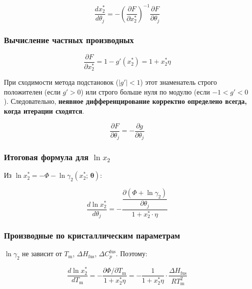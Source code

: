 \documentclass[11pt]{article}
\begin{document}
\begin{equation*}
\frac{dx_2^{*}}{d\theta_j} = -\left(\frac{\partial F}{\partial x_2^{*}}\right)^{-1} \frac{\partial F}{\partial \theta_j}
\end{equation*}

\subsubsection{Вычисление частных производных}

\begin{equation*}
\frac{\partial F}{\partial x_2^{*}} = 1 - g'(x_2^{*}) = 1 + x_2^{*} \eta
\end{equation*}

При сходимости метода подстановок ($|g'| < 1$) этот знаменатель строго положителен (если $g' > 0$) или строго больше нуля по модулю (если $-1 < g' < 0$). Следовательно, \textbf{неявное дифференцирование корректно определено всегда, когда итерации сходятся}.

\begin{equation*}
\frac{\partial F}{\partial \theta_j} = -\frac{\partial g}{\partial \theta_j}
\end{equation*}

\subsubsection{Итоговая формула для $\ln x_2$}

Из $\ln x_2^{*} = -\Phi - \ln \gamma_2(x_2^{*};\, \boldsymbol{\theta})$:

\begin{equation*}
\boxed{\frac{d\ln x_2^{*}}{d\theta_j} = -\frac{\dfrac{\partial (\Phi + \ln \gamma_2)}{\partial \theta_j}}{1 + x_2^{*} \cdot \eta}}
\end{equation*}

\subsubsection{Производные по кристаллическим параметрам}

$\ln \gamma_2$ не зависит от $T_{\mathrm{m}}$, $\Delta H_{\mathrm{fus}}$, $\Delta C_p^{\mathrm{fus}}$. Поэтому:

\begin{equation*}
\frac{d\ln x_2^{*}}{dT_{\mathrm{m}}} = -\frac{\partial \Phi / \partial T_{\mathrm{m}}}{1 + x_2^{*}\eta} = -\frac{1}{1 + x_2^{*}\eta} \cdot \frac{\Delta H_{\mathrm{fus}}}{RT_{\mathrm{m}}^2}
\end{equation*}
\end{document}
